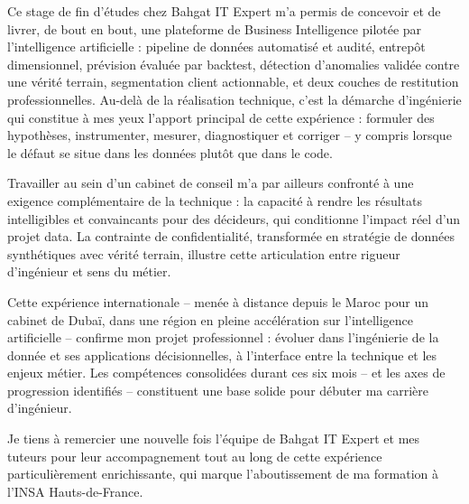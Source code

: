 \documentclass[12pt,a4paper]{report}
\begin{document}
Ce stage de fin d'études chez Bahgat IT Expert m'a permis de concevoir et de
livrer, de bout en bout, une plateforme de Business Intelligence pilotée par
l'intelligence artificielle : pipeline de données automatisé et audité,
entrepôt dimensionnel, prévision évaluée par backtest, détection d'anomalies
validée contre une vérité terrain, segmentation client actionnable, et deux
couches de restitution professionnelles. Au-delà de la réalisation technique,
c'est la démarche d'ingénierie qui constitue à mes yeux l'apport principal de
cette expérience : formuler des hypothèses, instrumenter, mesurer, diagnostiquer
et corriger -- y compris lorsque le défaut se situe dans les données plutôt que
dans le code.

Travailler au sein d'un cabinet de conseil m'a par ailleurs confronté à une
exigence complémentaire de la technique : la capacité à rendre les résultats
intelligibles et convaincants pour des décideurs, qui conditionne l'impact
réel d'un projet data. La contrainte de confidentialité, transformée en
stratégie de données synthétiques avec vérité terrain, illustre cette
articulation entre rigueur d'ingénieur et sens du métier.

Cette expérience internationale -- menée à distance depuis le Maroc pour un
cabinet de Dubaï, dans une région en pleine accélération sur l'intelligence
artificielle -- confirme mon projet
professionnel : évoluer dans l'ingénierie de la donnée et ses applications
décisionnelles, à l'interface entre la technique et les enjeux métier. Les
compétences consolidées durant ces six mois -- et les axes de progression
identifiés -- constituent une base solide pour débuter ma carrière
d'ingénieur.

Je tiens à remercier une nouvelle fois l'équipe de Bahgat IT Expert et mes
tuteurs pour leur accompagnement tout au long de cette expérience
particulièrement enrichissante, qui marque l'aboutissement de ma formation à
l'INSA Hauts-de-France.
\end{document}
